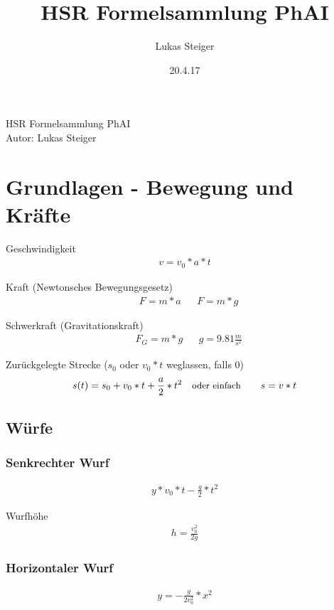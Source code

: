 \documentclass[17pt]{extarticle}
\author{Lukas Steiger}
\title{HSR Formelsammlung PhAI}
\date{20.4.17}
\begin{document}
\begin{center}
	\huge{HSR Formelsammlung PhAI} \\
	\small{Autor: Lukas Steiger}
\end{center}
	
\section{Grundlagen - Bewegung und Kräfte}

	Geschwindigkeit
	\begin{align}
		v = v_{0} * a * t
	\end{align}
	
	Kraft \small{(Newtonsches Bewegungsgesetz)}
	\begin{align}
		&F = m * a
		&&F = m * g
	\end{align}
	
	Schwerkraft \small{(Gravitationskraft)}
	\begin{align}
		&F_{G} = m * g
		&&g = 9.81 \frac{m}{s^{2}} 
	\end{align}
	
	Zurückgelegte Strecke \small{($s_{0}$ oder $v_{0}*t$ weglassen, falls 0)}
	\begin{align}
		&s(t) = s_{0} + v_{0} * t + \frac{a}{2} * t^{2}
		&&\text{\small{oder einfach}}
		&&&s = v * t
	\end{align}

	\subsection{Würfe}

	\subsubsection{Senkrechter Wurf}
	\begin{align}
		y * v_{0} * t - \frac{g}{2} * t^{2}
	\end{align}
	
	Wurfhöhe
	\begin{align}
		h = \frac{v_{0}^{2}}{2g}
	\end{align}
	
	\subsubsection{Horizontaler Wurf}
	\begin{align}
		y = - \frac{g}{2v_{0}^{2}} * x^{2}
	\end{align}
	
\end{document}
